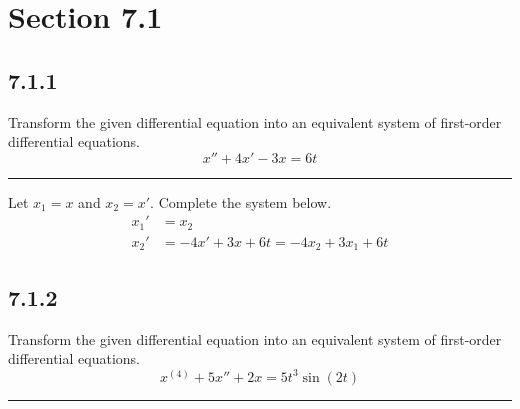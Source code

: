 \documentclass{article}
\begin{document}
\newcommand{\hr}{\par\noindent\rule{\textwidth}{0.4pt}}

\newcommand{\bc}[1]{
	\begin{equation*}
		\begin{boxed}
			{#1}
		\end{boxed}
	\end{equation*}
}

\newcommand{\cond}[2]{
	\ifmmode
		{#1} \quad {#2}
	\else
		$$ {#1} \quad {#2} $$
	\fi
}

\newcommand{\matr}[1]{
	\ifmmode \bm{#1}
	\else \textit{\textbf{#1}}
	\fi
}
\newcommand{\vect}[1]{
	\ifmmode \mathbf{#1}
	\else \textbf{#1}
	\fi
}

\tableofcontents

\section{Section 7.1}

\subsection{7.1.1}

Transform the given differential equation into an equivalent system of first-order differential equations.
\begin{equation*}
	x'' + 4x' - 3x = 6t
\end{equation*}

\hr

Let $ x_1 = x $ and $ x_2 = x' $. Complete the system below.
\begin{align*}
	x_1' & = x_2 \\
	x_2' & = -4x' + 3x + 6t = -4x_2 + 3x_1 + 6t
\end{align*}

\subsection{7.1.2}

Transform the given differential equation into an equivalent system of first-order differential equations.
\begin{equation*}
	x^{(4)} + 5x'' + 2x = 5t^3\sin(2t)
\end{equation*}

\hr
\end{document}
